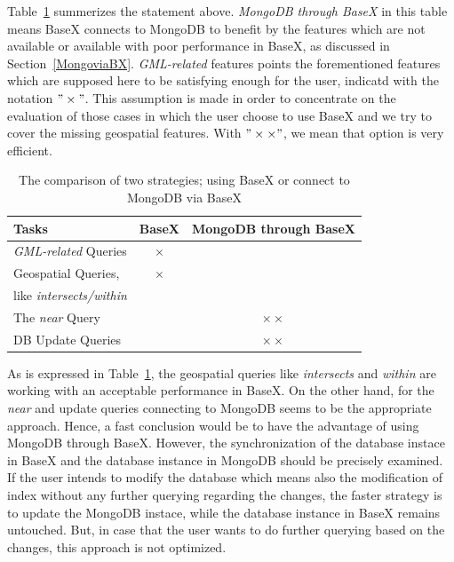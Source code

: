 \documentclass[a4paper,12pt]{article}
\begin{document}

Table~\ref{t.comparisonBaseXMongo} summerizes the statement above. \textit{MongoDB through BaseX} in this table means BaseX connects to MongoDB to benefit by the features which are not available or available with poor performance in BaseX, as discussed in Section~\ref{MongoviaBX}. \textit{GML-related} features points the forementioned features which are supposed here to be satisfying enough for the user, indicatd with the notation $"\times"$. This assumption is made in order to concentrate on the evaluation of those cases in which the user choose to use BaseX and we try to cover the missing geospatial features.
With $"\times\times"$, we mean that option is very efficient.
\vspace{10px}
\begin{table}
\centering
\begin{tabular}{|l | c | c|}\hline
\textbf{Tasks} & \textbf{BaseX} & \textbf{MongoDB through BaseX}\\\hline
 \textit{GML-related} Queries & $\times$ &\\\hline
 Geospatial Queries,  & $\times$ &\\
like \textit{intersects/within} & & \\\hline
 The \textit{near} Query & &$\times\times$ \\\hline
 DB Update Queries & &$\times\times$ 
\\\hline
\end{tabular}
\caption{The comparison of two strategies; using BaseX or connect to MongoDB via BaseX}
\label{t.comparisonBaseXMongo}
\end{table}
\vspace{10px}

As is expressed in Table~\ref{t.comparisonBaseXMongo}, the geospatial queries like \textit{intersects} and \textit{within} are working with an acceptable performance in BaseX. On the other hand, for the \textit{near} and update queries connecting to MongoDB seems to be the appropriate approach. Hence, a fast conclusion would be to have the advantage of using MongoDB through BaseX. However, the synchronization of the database instace in BaseX and the database instance in MongoDB should be precisely examined. If the user intends to modify the database which means also the modification of index without any further querying regarding the changes, the faster strategy is to update the MongoDB instace, while the database instance in BaseX remains untouched. But, in case that the user wants to do further querying based on the changes, this approach is not optimized.  
\end{document}

